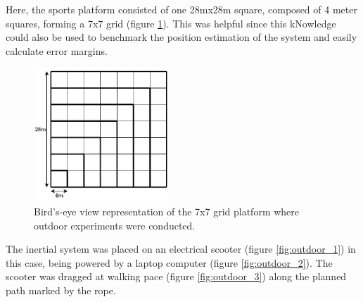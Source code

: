 Here, the sports platform consisted of one 28mx28m square, composed of 4 meter squares, forming a 7x7 grid (figure \ref{fig:platform_representation}). This was helpful since this kNowledge could also be used to benchmark the position estimation of the system and easily calculate error margins.

\begin{figure}[!h]
    \centering
    \includegraphics[width=0.45\textwidth]{figures/square.pdf}
    \caption{ Bird's-eye view representation of the 7x7 grid platform where outdoor experiments were conducted. }
    \label{fig:platform_representation}
\end{figure}





The inertial system was placed on an electrical scooter (figure \ref{fig:outdoor_1}) in this case, being powered by a laptop computer (figure \ref{fig:outdoor_2}). The scooter was dragged at walking pace (figure \ref{fig:outdoor_3}) along the planned path marked by the rope.

